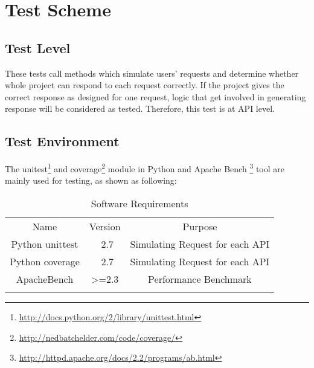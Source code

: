 \section{Test Scheme}
\label{sec:test_scheme}
\subsection{Test Level}
These tests call methods which simulate users' requests
and determine whether whole project can respond to each request correctly.
If the project gives the correct response as designed for one request, logic that get involved in generating response will be considered as tested.
Therefore, this test is at API level.

\subsection{Test Environment}
The unitest\footnote{\url{http://docs.python.org/2/library/unittest.html}}
and coverage\footnote{\url{http://nedbatchelder.com/code/coverage/}} module in Python and
Apache Bench \footnote{\url{http://httpd.apache.org/docs/2.2/programs/ab.html}}
tool are mainly used for testing, as shown as following:
\begin{table}[H]
  \begin{tabular}{c|c|c}
    \shline
    Name            & Version & Purpose                         \\ \shline
    Python unittest & ~2.7    & Simulating Request for each API \\ \hline
    Python coverage & ~2.7    & Simulating Request for each API \\ \hline
    ApacheBench     & >=2.3   & Performance Benchmark           \\ \shline
  \end{tabular}
  \centering
  \caption{Software Requirements\label{tab:Software}}
\end{table}
